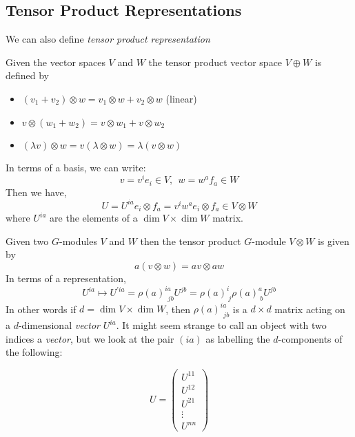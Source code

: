 \begin{enumerate}
\subsection{Tensor Product Representations}
We can also define \textit{tensor product representation}

Given the vector spaces $V$ and $W$ the tensor product vector space $V\oplus W$ is defined by 
\begin{itemize}
    \item $(v_1 + v_2)\otimes w = v_1\otimes w + v_2\otimes w$ (linear)
    \item $v\otimes(w_1 + w_2) = v\otimes w_1 + v\otimes w_2$
    \item $(\lambda v)\otimes w = v(\lambda\otimes w) = \lambda(v\otimes w)$ 
\end{itemize}
In terms of a basis, we can write: 
\begin{equation}
    v = v^ie_i\in V, \ \ w = w^af_a\in W 
\end{equation}
Then we have, 
\begin{equation}
    U = U^{ia}e_i\otimes f_a = v^iw^ae_i\otimes f_a\in V\otimes W
\end{equation}
where $U^{ia}$ are the elements of a $\dim V\times\dim W$ matrix. 

Given two $G$-modules $V$ and $W$ then the tensor product $G$-module $V\otimes W$ is given by
\begin{equation}
    a(v\otimes w) = av\otimes aw
\end{equation}
In terms of a representation, 
\begin{equation}
    U^{ia}\mapsto U^{'ia} = \rho(a)^{ia}_{\ \ jb}U^{jb} = \rho(a)^i_{\ j}\rho(a)^a_{\ b} U^{jb}
\end{equation}
In other words if $d = \dim V\times \dim W$, then $\rho(a)^{ia}_{\ \ jb}$ is a $d\times d$ matrix acting on a $d$-dimensional \textit{vector} $U^{ia}$. It might seem strange to call an object with two indices a \textit{vector}, but we look at the pair $(ia)$ as labelling the $d$-components of the following: 

\begin{equation}
    U = \begin{pmatrix}
        U^{11}\\
        U^{12}\\
        U^{21}\\
        \vdots\\
        U^{nn}
    \end{pmatrix}
\end{equation}

\end{enumerate}
